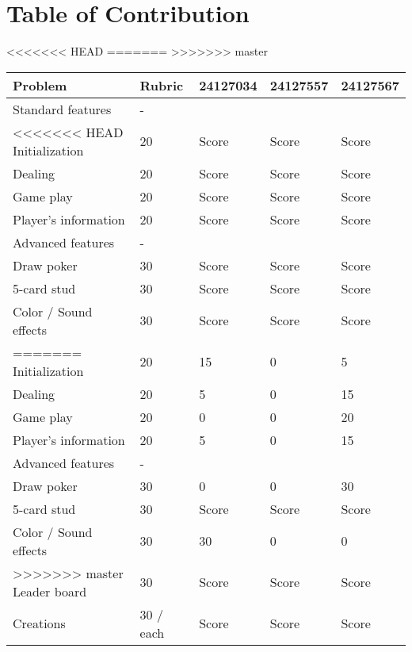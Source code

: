 \section{Table of Contribution}
<<<<<<< HEAD
\label{sec:table-of-contribution}
=======
\label{sec:contribution-table}
>>>>>>> master

\renewcommand{\arraystretch}{1.5} %
\begin{table}[ht]
    \centering
    \begin{tabular}{|m{4cm}|m{2cm}|m{2cm}|m{2cm}| m{2cm}|}
    \hline
    \textbf{Problem} & \textbf{Rubric} & \textbf{24127034} & \textbf{24127557} & \textbf{24127567} \\
    \hline
    Standard features & - &  &  &  \\
    \hline
<<<<<<< HEAD
    Initialization & 20 & Score & Score & Score \\
    \hline
    Dealing & 20 & Score & Score & Score \\
    \hline 
    Game play & 20 & Score & Score & Score \\
    \hline
    Player's information & 20 & Score & Score & Score \\
    \hline
    Advanced features & - &  &  &  \\
    \hline 
    Draw poker & 30 & Score & Score & Score \\
    \hline
    5-card stud & 30 & Score & Score & Score \\
    \hline
    Color / Sound effects & 30 & Score & Score & Score \\
=======
    Initialization & 20 & 15 & 0 & 5 \\
    \hline
    Dealing & 20 & 5 & 0 & 15 \\
    \hline 
    Game play & 20 & 0 & 0 & 20 \\
    \hline
    Player's information & 20 & 5 & 0 & 15 \\
    \hline
    Advanced features & - &  &  &  \\
    \hline 
    Draw poker & 30 & 0 & 0 & 30 \\
    \hline
    5-card stud & 30 & Score & Score & Score \\
    \hline
    Color / Sound effects & 30 & 30 & 0 & 0 \\
>>>>>>> master
    \hline
    Leader board & 30 & Score & Score & Score \\
    \hline
    Creations & 30 / each & Score & Score & Score \\

\end{tabular}
\end{table}
